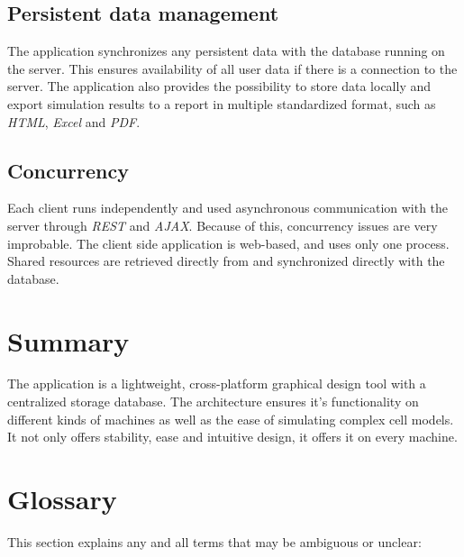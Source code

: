 \documentclass{report}
\begin{document}
		\subsection{Persistent data management}
			The application synchronizes any persistent data with the database running on the server. This ensures availability of all user data if there is a connection to the server. The application also provides the possibility to store data locally and export simulation results to a report in multiple standardized format, such as \emph{HTML}, \emph{Excel} and \emph{PDF}.			
		\subsection{Concurrency}
			Each client runs independently and used asynchronous communication with the server through \emph{REST} and \emph{AJAX}. Because of this, concurrency issues are very improbable. The client side application is web-based, and uses only one process. Shared resources are retrieved directly from and synchronized directly with the database.
	\clearpage
	\section{Summary}
		The application is a lightweight, cross-platform graphical design tool with a centralized storage database. The architecture ensures it's functionality on different kinds of machines as well as the ease of simulating complex cell models. It not only offers stability, ease and intuitive design, it offers it on every machine.
	\section{Glossary}
		This section explains any and all terms that may be ambiguous or unclear:\\
\end{document}
